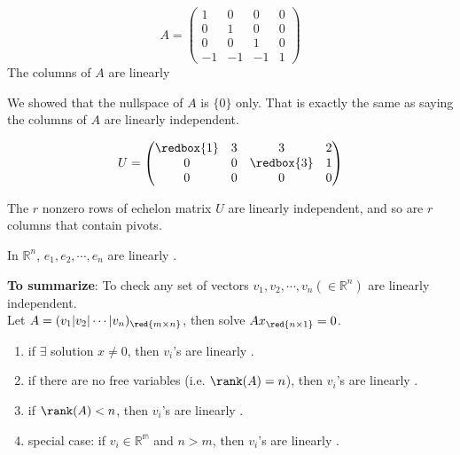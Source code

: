 \newpage
\begin{eg}
    \[
        A = \begin{pmatrix}
            1 & 0 & 0 & 0 \\
            0 & 1 & 0 & 0 \\
            0 & 0 & 1 & 0 \\
            -1 & -1 & -1 & 1
        \end{pmatrix}
    \]
    The columns of $A$ are linearly 
\end{eg}

\begin{note}
    We showed that the nullspace of $A$ is $\{0\}$ only. That is exactly the same as saying the columns of $A$ are linearly independent.
\end{note}

\begin{eg}
    \[
    U = \begin{pmatrix}
        \redbox{1} & 3 & 3 & 2 \\
        0 & 0 & \redbox{3} & 1 \\
        0 & 0 & 0 & 0 \\
    \end{pmatrix}
    \]
\end{eg}

\begin{proposition}[2F]
    The $r$ nonzero rows of echelon matrix $U$ are linearly independent, and so are $r$ columns that contain pivots.
    \begin{eg}
        In $\mathbb{R}^n$, $e_1, e_2, \cdots, e_n$ are linearly .
    \end{eg}
\end{proposition}

\vspace{2em}
\textbf{To summarize}: To check any set of vectors $v_1, v_2, \cdots, v_n(\in \mathbb{R}^n)$ are linearly independent. \\
Let $A = (v_1|v_2|\cdots|v_n)_{\red{m \times n}}$, then solve $Ax_{\red{n \times 1}} = 0$.
\begin{enumerate}[$\arabic*^\circ$]
    \item if $\exists$ solution $x \neq 0$, then $v_i$'s are linearly .
    \item if there are no free variables (i.e. $\rank(A) = n$),  then $v_i$'s are linearly .
    \item if $\rank(A) < n$, then $v_i$'s are linearly .
    \item special case: if $v_i \in \mathbb{R^m}$ and $n > m$, then $v_i$'s are linearly .
\end{enumerate}

